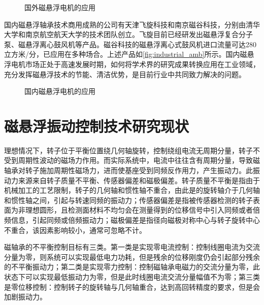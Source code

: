 \begin{figure}[H]
  \quad
  \quad
  \quad  
  \caption[国外磁悬浮电机的应用]{国外磁悬浮电机的应用\label{fig:industrial_amb}}
\end{figure}

国内磁悬浮轴承技术商用成熟的公司有天津飞旋科技和南京磁谷科技，分别由清华大学和南京航空航天大学的技术团队创立。飞旋目前已经研发出磁悬浮复合分子泵、磁悬浮离心鼓风机等产品。磁谷科技的磁悬浮离心式鼓风机进口流量可达280立方米/分，已应用在多种场合。上述产品如\autoref{fig:industrial_amb}所示。国内磁悬浮电机市场正处于高速发展时期，如何将学术界的研究成果转换应用在工业领域，充分发挥磁悬浮技术的节能、清洁优势，是目前行业中共同致力解决的问题。

\begin{figure}[H]
  \quad
  \quad
  \caption[国内磁悬浮电机的应用]{国内磁悬浮电机的应用\label{fig:industrial_amb_cn}}
\end{figure}

\section{磁悬浮振动控制技术研究现状}
理想情况下，转子位于平衡位置绕几何轴旋转，控制绕组电流无周期分量，转子不受到周期性波动的磁场力作用。而实际系统中，电流中往往含有周期分量，导致磁轴承对转子施加周期性磁场力，进而使基座受到同频反作用力，产生振动力。此振动力来源来自转子质量不平衡、传感器偏差和磁极偏差。转子质量不平衡是指由于机械加工的工艺限制，转子的几何轴和惯性轴不重合，由此是的旋转轴介于几何轴和惯性轴之间，引起与转速同频的振动力；传感器偏差是指被传感器检测的转子表面为非理想圆形，且检测面材料不均匀会在测量得到的位移信号中引入同频或者倍频信息，引起同频或倍频振动力；磁极偏差是指径向磁极对称中心与转子旋转中心不重合，该因素影响较小，通常可忽略不计。

磁轴承的不平衡控制目标有三类。第一类是实现零电流控制：控制线圈电流为交流分量为零，则系统可以实现最低电力功耗，但是残余的位移刚度仍会引起部分残余的不平衡振动力；第二类是实现零力控制：控制磁轴承电磁力的交流分量为零，此状态下可以实现最低振动力为零，但是此时线圈电流交流分量幅值不为零；第三类是零位移控制：控制转子的旋转轴与几何轴重合，达到高回转精度的要求，但是会加剧振动力。

